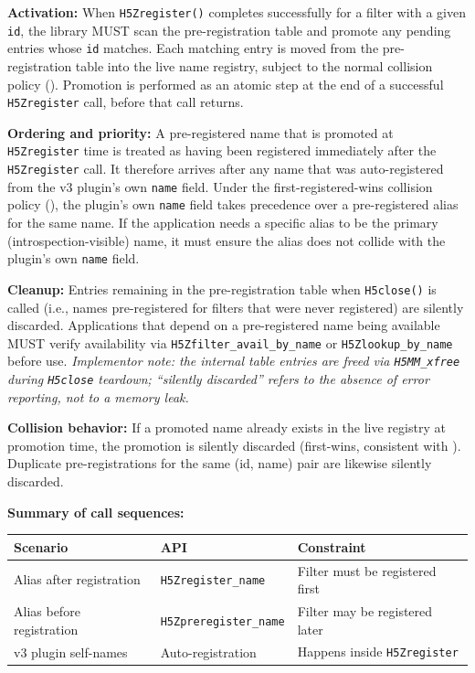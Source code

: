 \documentclass[../HDF5_RFC.tex]{subfiles}
\begin{document}
\textbf{Activation:} When \texttt{H5Zregister()} completes successfully for a filter
with a given \texttt{id}, the library MUST scan the pre-registration table and
promote any pending entries whose \texttt{id} matches. Each matching entry is moved
from the pre-registration table into the live name registry, subject to the
normal collision policy (). Promotion is
performed as an atomic step at the end of a successful \texttt{H5Zregister} call,
before that call returns.

\textbf{Ordering and priority:} A pre-registered name that is promoted at
\texttt{H5Zregister} time is treated as having been registered immediately after the
\texttt{H5Zregister} call. It therefore arrives after any name that was
auto-registered from the v3 plugin's own \texttt{name} field. Under the
first-registered-wins collision policy (),
the plugin's own \texttt{name} field takes precedence over a pre-registered alias
for the same name. If the application needs a specific alias to be the
primary (introspection-visible) name, it must ensure the alias does not
collide with the plugin's own \texttt{name} field.

\textbf{Cleanup:} Entries remaining in the pre-registration table when
\texttt{H5close()} is called (i.e., names pre-registered for filters that were
never registered) are silently discarded. Applications that depend on a
pre-registered name being available MUST verify availability via
\texttt{H5Zfilter\_avail\_by\_name} or \texttt{H5Zlookup\_by\_name} before use.
\emph{Implementor note: the internal table entries are freed via
\texttt{H5MM\_xfree} during \texttt{H5close} teardown; ``silently discarded''
refers to the absence of error reporting, not to a memory leak.}

\textbf{Collision behavior:} If a promoted name already exists in the live
registry at promotion time, the promotion is silently discarded (first-wins,
consistent with ). Duplicate pre-registrations
for the same (id, name) pair are likewise silently discarded.

\textbf{Summary of call sequences:}

\begin{center}
\begin{tabularx}{\textwidth}{llX}
\toprule
\textbf{Scenario} & \textbf{API} & \textbf{Constraint} \\
\midrule
Alias after registration & \texttt{H5Zregister\_name} & Filter must be registered first \\
Alias before registration & \texttt{H5Zpreregister\_name} & Filter may be registered later \\
v3 plugin self-names & Auto-registration & Happens inside \texttt{H5Zregister} \\
\bottomrule
\end{tabularx}
\end{center}
\end{document}
